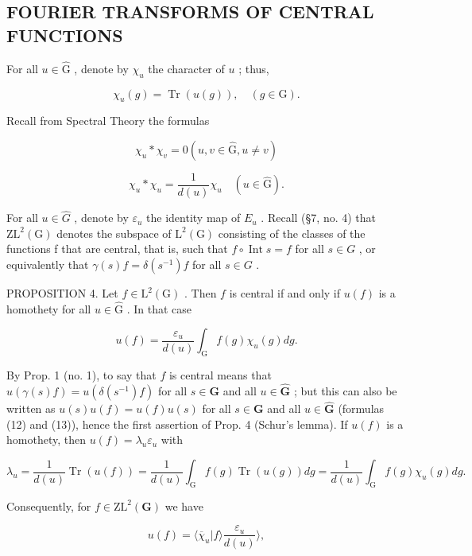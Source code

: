 \subsection{FOURIER TRANSFORMS OF CENTRAL FUNCTIONS}

For all \(u \in \hat{\mathrm{G}}\) , denote by \(\chi_u\) the character of \(u\) ; thus,

\[
\chi_ {u} (g) = \operatorname{Tr} (u (g)), \quad (g \in \mathrm{G}).\tag{16}
\]

Recall from Spectral Theory the formulas

\[
\chi_ {u} * \chi_ {v} = 0 (u, v \in \hat {\mathrm{G}}, u \neq v)\tag{17}
\]

\[
\chi_ {u} * \chi_ {u} = \frac {1}{d (u)} \chi_ {u} \quad (u \in \hat {\mathrm{G}}).\tag{18}
\]

For all \(u \in \hat{G}\) , denote by \(\varepsilon_{u}\) the identity map of \(E_{u}\) . Recall (§7, no. 4) that \(\mathrm{ZL}^{2}(\mathrm{G})\) denotes the subspace of \(\mathrm{L}^{2}(\mathrm{G})\) consisting of the classes of the functions f that are central, that is, such that \(f \circ \operatorname{Int}s = f\) for all \(s \in G\) , or equivalently that \(\gamma(s)f = \delta(s^{-1})f\) for all \(s \in G\) .

PROPOSITION 4. Let \(f \in \mathrm{L}^2(\mathrm{G})\) . Then \(f\) is central if and only if \(u(f)\) is a homothety for all \(u \in \hat{\mathrm{G}}\) . In that case

\[
u (f) = \frac {\varepsilon_ {u}}{d (u)} \int_ {\mathrm{G}} f (g) \chi_ {u} (g) d g.\tag{19}
\]

By Prop. 1 (no. 1), to say that \(f\) is central means that \(u(\gamma(s)f) = u(\delta(s^{-1})f)\) for all \(s \in \mathbf{G}\) and all \(u \in \hat{\mathbf{G}}\) ; but this can also be written as \(u(s)u(f) = u(f)u(s)\) for all \(s \in \mathbf{G}\) and all \(u \in \hat{\mathbf{G}}\) (formulas (12) and (13)), hence the first assertion of Prop. 4 (Schur's lemma). If \(u(f)\) is a homothety, then \(u(f) = \lambda_u\varepsilon_u\) with

\[
\lambda_ {u} = \frac {1}{d (u)} \operatorname{Tr} (u (f)) = \frac {1}{d (u)} \int_ {\mathrm{G}} f (g) \operatorname{Tr} (u (g)) d g = \frac {1}{d (u)} \int_ {\mathrm{G}} f (g) \chi_ {u} (g) d g.
\]

Consequently, for \(f \in \mathrm{ZL}^2(\mathbf{G})\) we have

\[
u (f) = \langle \overline {{\chi}} _ {u} | f \rangle \frac {\varepsilon_ {u}}{d (u)} \rangle ,\tag{20}
\]

